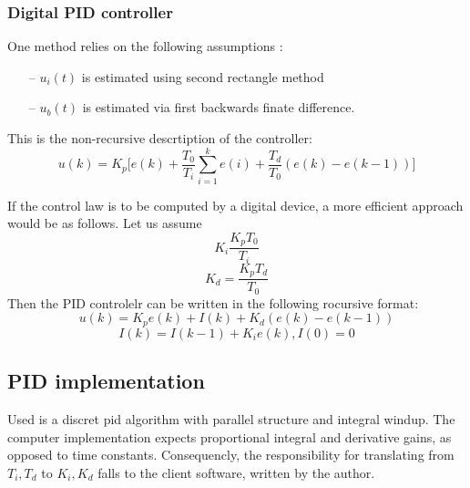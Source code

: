 \subsubsection{Digital PID controller}
One method relies on the following assumptions \cite[p. 88]{garipov}:
\begin{itemize}
\item[--]{$u_i(t)$ is estimated using second rectangle method}
\item[--]{$u_b(t)$ is estimated via first backwards finate difference.}
\end{itemize}
This is the non-recursive descrtiption of the controller:
\begin{equation}
    u(k) = K_p \Bigg[
    e(k) + \frac{T_0}{T_i} \sum_{i=1}^{k} e(i) + \frac{T_d}{T_0} (e(k)-e(k-1))
    \Bigg]
\end{equation}
\par
If the control law is to be computed by a digital device, a more efficient approach would be as follows.
Let us assume
$$ K_i \frac{K_p T_0}{T_i} $$
$$ K_d = \frac{K_p T_d}{T_0} $$
Then the PID controlelr can be written in the following rocursive format:
\begin{equation}
    u(k) = K_p e(k) + I(k) + K_d (e(k) - e(k-1))
\end{equation}
\begin{equation}
    I(k) = I(k-1) + K_i e(k),
    I(0) = 0
\end{equation}

\subsection{PID implementation}
Used is a discret pid algorithm with parallel structure and integral windup.
The computer implementation expects proportional integral and derivative gains, as opposed to time constants.
Consequencly, the responsibility for translating from $T_i, T_d$ to $K_i, K_d$ falls to the client software, written by the author.

